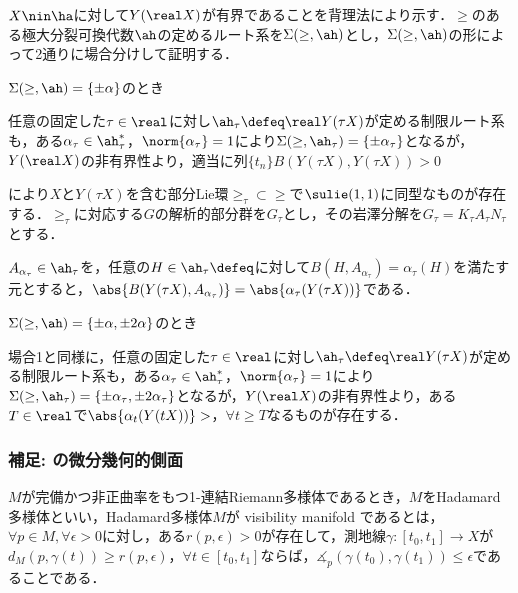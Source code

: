 \begin{pfwn}{}

  $X\nin \ha$に対して$Y(\real X)$が有界であることを背理法により示す．$\ge$のある極大分裂可換代数$\ah$の定めるルート系を$\Sigma(\ge,\ah) $とし，$\Sigma(\ge,\ah) $の形によって2通りに場合分けして証明する．
  
  \begin{case}
    $\Sigma(\ge,\ah) = \{\pm\alpha \}$のとき

    任意の固定した$\tau \in \real$に対し$\ah_{\tau} \defeq \real Y(\tau X)$が定める制限ルート系も，ある$\alpha_{\tau} \in \ah_{\tau}^{*}$，$ \norm{\alpha_{\tau}} = 1 $により$\Sigma(\ge,\ah_{\tau}) = \{\pm\alpha_{\tau} \}$となるが，$Y(\real X) $の非有界性より，適当に列$\{t_{n}\} $$B(Y(\tau X), Y(\tau X))  > 0 $

    により$X$と$Y(\tau X) $を含む部分Lie環$\ge_{\tau} \subset \ge $で$\sulie(1,1) $に同型なものが存在する．$\ge_{\tau} $に対応する$G$の解析的部分群を$G_{\tau}$とし，その岩澤分解を$G_{\tau} = K_{\tau}A_{\tau}N_{\tau} $とする．

    $A_{\alpha_{\tau}}\in \ah_{\tau} $を，任意の$H\in \ah_{\tau}\defeq  $に対して$B(H,A_{\alpha_{\tau}}) = \alpha_{\tau}(H) $を満たす元とすると，$\abs{B(Y(\tau X), A_{\alpha_{\tau}})} =  \abs{\alpha_{\tau}(Y(\tau X))}$である．
    
  \end{case}

  \begin{case}
    $\Sigma(\ge,\ah) = \{\pm\alpha,\pm 2\alpha \}$のとき

    場合1と同様に，任意の固定した$\tau \in \real$に対し$\ah_{\tau} \defeq \real Y(\tau X)$が定める制限ルート系も，ある$\alpha_{\tau} \in \ah_{\tau}^{*}$，$ \norm{\alpha_{\tau}} = 1 $により$\Sigma(\ge,\ah_{\tau}) = \{\pm\alpha_{\tau}, \pm 2\alpha_{\tau} \}$となるが，$Y(\real X) $の非有界性より，ある$T\in \real$で$\abs{\alpha_{t}(Y(tX))} >  $，$\forall t \geq T$なるものが存在する．
    
    
  \end{case}
  
\end{pfwn}


\subsubsection{補足: の微分幾何的側面}
\begin{defi}{\cite[Definition~1.3]{e72-1}}\label{def:visibility}

  $M$が完備かつ非正曲率をもつ1-連結Riemann多様体であるとき，$M$をHadamard多様体といい，Hadamard多様体$M$が visibility manifold であるとは，$\forall p\in M, \forall \epsilon > 0$に対し，ある$r(p,\epsilon) >0 $が存在して，測地線$\gamma\colon [t_0, t_1]\to X $が$d_{M}(p, \gamma(t))\geq r(p,\epsilon) $，$\forall t\in [t_0, t_1]$ならば，$\measuredangle_{p}(\gamma(t_0), \gamma(t_1)) \leq \epsilon $であることである．
\end{defi}

